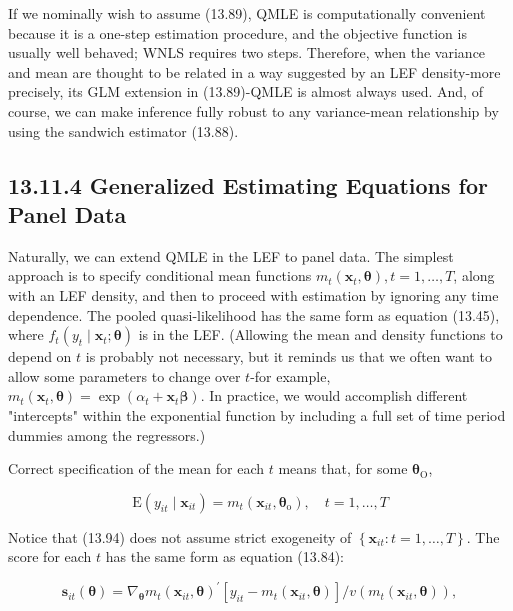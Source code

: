 \documentclass[10pt]{article}
\begin{document}
If we nominally wish to assume (13.89), QMLE is computationally convenient because it is a one-step estimation procedure, and the objective function is usually well behaved; WNLS requires two steps. Therefore, when the variance and mean are thought to be related in a way suggested by an LEF density-more precisely, its GLM extension in (13.89)-QMLE is almost always used. And, of course, we can make inference fully robust to any variance-mean relationship by using the sandwich estimator (13.88).

\subsection*{13.11.4 Generalized Estimating Equations for Panel Data}
Naturally, we can extend QMLE in the LEF to panel data. The simplest approach is to specify conditional mean functions $m_{t}\left(\mathbf{x}_{t}, \boldsymbol{\theta}\right), t=1, \ldots, T$, along with an LEF density, and then to proceed with estimation by ignoring any time dependence. The pooled quasi-likelihood has the same form as equation (13.45), where $f_{t}\left(y_{t} \mid \mathbf{x}_{t} ; \boldsymbol{\theta}\right)$ is in the LEF. (Allowing the mean and density functions to depend on $t$ is probably not necessary, but it reminds us that we often want to allow some parameters to change over $t$-for example, $m_{t}\left(\mathbf{x}_{t}, \boldsymbol{\theta}\right)=\exp \left(\alpha_{t}+\mathbf{x}_{t} \boldsymbol{\beta}\right)$. In practice, we would accomplish different "intercepts" within the exponential function by including a full set of time period dummies among the regressors.)

Correct specification of the mean for each $t$ means that, for some $\boldsymbol{\theta}_{\mathrm{O}}$,


\begin{equation*}
\mathrm{E}\left(y_{i t} \mid \mathbf{x}_{i t}\right)=m_{t}\left(\mathbf{x}_{i t}, \boldsymbol{\theta}_{\mathrm{o}}\right), \quad t=1, \ldots, T \tag{13.94}
\end{equation*}


Notice that (13.94) does not assume strict exogeneity of $\left\{\mathbf{x}_{i t}: t=1, \ldots, T\right\}$. The score for each $t$ has the same form as equation (13.84):


\begin{equation*}
\mathbf{s}_{i t}(\boldsymbol{\theta})=\nabla_{\boldsymbol{\theta}} m_{t}\left(\mathbf{x}_{i t}, \boldsymbol{\theta}\right)^{\prime}\left[y_{i t}-m_{t}\left(\mathbf{x}_{i t}, \boldsymbol{\theta}\right)\right] / v\left(m_{t}\left(\mathbf{x}_{i t}, \boldsymbol{\theta}\right)\right), \tag{13.95}
\end{equation*}
\end{document}

